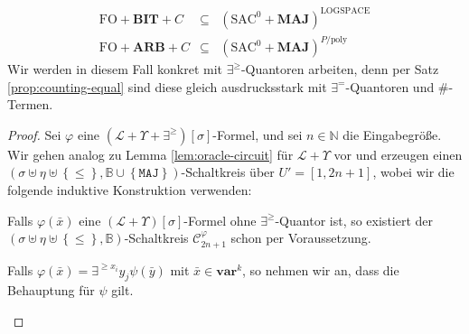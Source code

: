 \begin{eqnarray*}
\mathrm{FO}+\mathbf{BIT}+C & \subseteq & \left(\mathrm{SAC}^{0}+\mathbf{MAJ}\right)^{\mathrm{LOGSPACE}}\\
\mathrm{FO}+\mathbf{ARB}+C & \subseteq & \left(\mathrm{SAC}^{0}+\mathbf{MAJ}\right)^{P/\mathrm{poly}}
\end{eqnarray*}
Wir werden in diesem Fall konkret mit $\exists^{\geqslant}$-Quantoren
arbeiten, denn per Satz \ref{prop:counting-equal} sind diese gleich
ausdrucksstark mit $\exists^{=}$-Quantoren und $\#$-Termen.
\begin{proof}
Sei $\varphi$ eine $\left(\mathcal{L}+\Upsilon+\exists^{\geqslant}\right)\left[\sigma\right]$-Formel,
und sei $n\in\mathbb{N}$ die Eingabegröße. Wir gehen analog zu Lemma
\ref{lem:oracle-circuit} für $\mathcal{L}+\Upsilon$ vor und erzeugen
einen $\left(\sigma\uplus\eta\uplus\left\{ \leqslant\right\} ,\mathbb{B}\cup\left\{ \mathtt{MAJ}\right\} \right)$-Schaltkreis
über $U'=\left[1,2n+1\right]$, wobei wir die folgende induktive Konstruktion
verwenden:

\begin{casenv}
\item Falls $\varphi\left(\bar{x}\right)$ eine $\left(\mathcal{L}+\Upsilon\right)\left[\sigma\right]$-Formel
ohne $\exists^{\geqslant}$-Quantor ist, so existiert der $\left(\sigma\uplus\eta\uplus\left\{ \leqslant\right\} ,\mathbb{B}\right)$-Schaltkreis
$\mathcal{C}_{2n+1}^{\varphi}$ schon per Voraussetzung.
\item Falls $\varphi\left(\bar{x}\right)=\exists^{\geqslant x_{i}}y_{j}\psi\left(\bar{y}\right)$
mit $\bar{x}\in\mathbf{var}^{k}$, so nehmen wir an, dass die Behauptung
für $\psi$ gilt. 


\end{casenv}
\end{proof}
